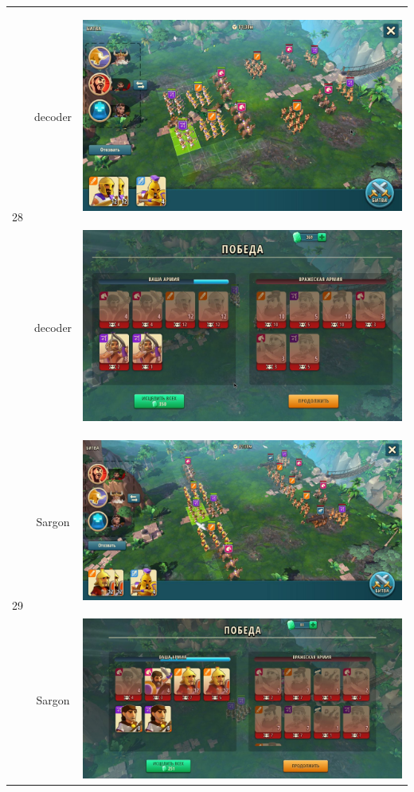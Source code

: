 \begin{longtable}{|c|c|c|}
	\hline
	\multirow{2}{*}{28} & decoder &
	\hypertarget{fight28}{\includegraphics[width=0.75\linewidth]{./parts/media/TreasureHunt/28/decoder/photo_2022-04-13_19-02-12.jpg}} \\
	& decoder &
	\includegraphics[width=0.75\linewidth]{./parts/media/TreasureHunt/28/decoder/photo_2022-04-13_19-02-29.jpg} \\
	\hline
	\multirow{6}{*}{29} & Sargon &
	\hypertarget{fight29}{\includegraphics[width=0.75\linewidth]{./parts/media/TreasureHunt/29/sargon/photo_2022-04-07_10-02-57.jpg}} \\
	& Sargon &
	\includegraphics[width=0.75\linewidth]{./parts/media/TreasureHunt/29/sargon/photo_2022-04-07_10-03-11.jpg} \\

\end{longtable}
